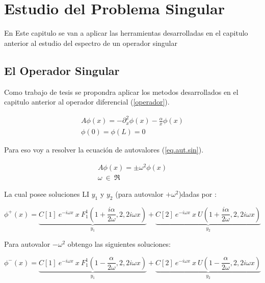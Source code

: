 
\chapter{Estudio del Problema Singular}

    En Este capitulo se van a aplicar las herramientas desarrolladas en el capitulo anterior al estudio del espectro de un operador singular

\section{El Operador Singular}

Como trabajo de tesis se propondra aplicar los metodos desarrollados en el capitulo anterior al operador diferencial (\ref{operador}).

\begin{equation}
\begin{array}{c}
    A \phi (x) = - \partial ^2 _x  \phi(x) - \frac{\alpha}{x} \phi(x) \\
    \phi(0) = \phi(L) = 0 
\end{array}
\label{operador}
\end{equation}

Para eso voy a resolver la ecuación de autovalores (\ref{eq.aut.sin}).

\begin{equation}
\begin{array}{c}
    A  \phi (x)  =  \pm \omega ^2 \phi (x) \\ 
    \omega \ \in \ \mathfrak{R}
\end{array}
\label{eq.aut.sin}
\end{equation}

La cual posee soluciones LI $ y_1 $ y $ y_2 $ (para autovalor $+ \omega ^2$)dadas por :

\begin{equation}
    \phi ^{+} (x) = 
    \underbrace{
    C[1] \ e ^{-i \omega x} \ x \ F _{1} ^{1} (1+\frac{i \alpha}{2 \omega},2,2 i \omega x) } _ {y_1}
    + \underbrace{C[2] \ e^{-i \omega x } \ x \ U (1+\frac{i \alpha}{2 \omega},2,2 i \omega x) } _{y_2} 
\end{equation}


Para autovalor $- \omega ^2 $ obtengo las siguientes soluciones:

\begin{equation}
    \phi ^{-} (x) = 
    \underbrace{
    C[1] \ e ^{-i \omega x} \ x \ F _{1} ^{1} (1 - \frac{ \alpha}{2 \omega},2,2 i \omega x) } _ {y_1}
    + \underbrace{C[2] \ e^{-i \omega x } \ x \ U (1 - \frac{ \alpha}{2 \omega},2,2 i \omega x) } _{y_2} 
\end{equation}

